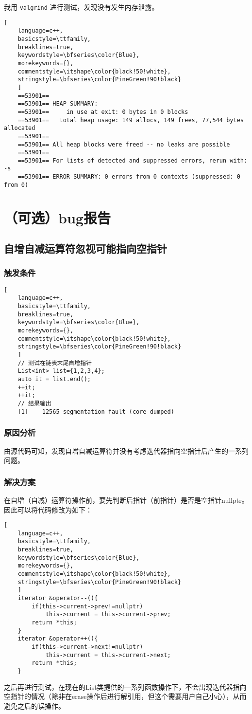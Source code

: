 \documentclass[UTF8]{ctexart}
\begin{document}
我用 \texttt{valgrind} 进行测试，发现没有发生内存泄露。
\begin{lstlisting}[ 
    language=c++,
    basicstyle=\ttfamily,
    breaklines=true,
    keywordstyle=\bfseries\color{Blue}, 
    morekeywords={}, 
    commentstyle=\itshape\color{black!50!white},
    stringstyle=\bfseries\color{PineGreen!90!black} 
    ]
    ==53901== 
    ==53901== HEAP SUMMARY:
    ==53901==     in use at exit: 0 bytes in 0 blocks
    ==53901==   total heap usage: 149 allocs, 149 frees, 77,544 bytes allocated
    ==53901== 
    ==53901== All heap blocks were freed -- no leaks are possible
    ==53901== 
    ==53901== For lists of detected and suppressed errors, rerun with: -s
    ==53901== ERROR SUMMARY: 0 errors from 0 contexts (suppressed: 0 from 0)
\end{lstlisting}
\section{（可选）bug报告}
\subsection{自增自减运算符忽视可能指向空指针}

\subsubsection{触发条件}
\begin{lstlisting}[ 
    language=c++,
    basicstyle=\ttfamily,
    breaklines=true,
    keywordstyle=\bfseries\color{Blue}, 
    morekeywords={}, 
    commentstyle=\itshape\color{black!50!white},
    stringstyle=\bfseries\color{PineGreen!90!black} 
    ]
    // 测试在链表末尾自增指针
    List<int> list={1,2,3,4};
    auto it = list.end();
    ++it;
    ++it;
    // 结果输出
    [1]    12565 segmentation fault (core dumped)
\end{lstlisting}
\subsubsection{原因分析}
由源代码可知，发现自增自减运算符并没有考虑迭代器指向空指针后产生的一系列问题。
\subsubsection{解决方案}
在自增（自减）运算符操作前，要先判断后指针（前指针）是否是空指针nullptr。因此可以将代码修改为如下：
\begin{lstlisting}[ 
    language=c++,
    basicstyle=\ttfamily,
    breaklines=true,
    keywordstyle=\bfseries\color{Blue}, 
    morekeywords={}, 
    commentstyle=\itshape\color{black!50!white},
    stringstyle=\bfseries\color{PineGreen!90!black} 
    ]
    iterator &operator--(){
        if(this->current->prev!=nullptr)
            this->current = this->current->prev;
        return *this;
    }
    iterator &operator++(){
        if(this->current->next!=nullptr)
            this->current = this->current->next;
        return *this;
    }
\end{lstlisting}
之后再进行测试，在现在的List类提供的一系列函数操作下，不会出现迭代器指向空指针的情况（除非在erase操作后进行解引用，但这个需要用户自己小心），从而避免之后的误操作。
\end{document}
